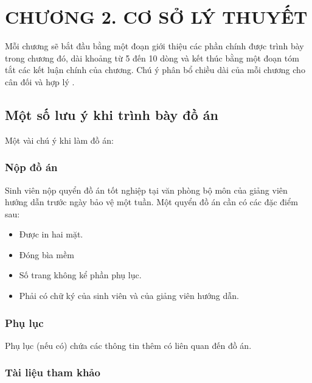 \documentclass{thesis}
\begin{document}
\newpage
\section*{CHƯƠNG 2. CƠ SỞ LÝ THUYẾT}

\setcounter{section}{2}
    \setcounter{subsection}{0}
        \setcounter{figure}{0}
            \setcounter{table}{0}

Mỗi chương sẽ bắt đầu bằng một đoạn giới thiệu các phần chính được trình bày trong chương đó, dài khoảng từ 5 đến 10 dòng và kết thúc bằng một đoạn tóm tắt các kết luận chính của chương. Chú ý phân bổ chiều dài của mỗi chương cho cân đối và hợp lý \cite{658198}.

\subsection{Một số lưu ý khi trình bày đồ án}
Một vài chú ý khi làm đồ án:

\subsubsection{Nộp đồ án}
Sinh viên nộp quyển đồ án tốt nghiệp tại văn phòng bộ môn của giảng viên hướng dẫn trước ngày bảo vệ một tuần. Một quyển đồ án cần có các đặc điểm sau:

\begin{itemize}
    \item Được in hai mặt.
    \item Đóng bìa mềm
    \item Số trang không kể phần phụ lục.
    \item Phải có chữ ký của sinh viên và của giảng viên hướng dẫn.
\end{itemize}

\subsubsection{Phụ lục}
Phụ lục (nếu có) chứa các thông tin thêm có liên quan đến đồ án.

\subsubsection{Tài liệu tham khảo}
\end{document}
